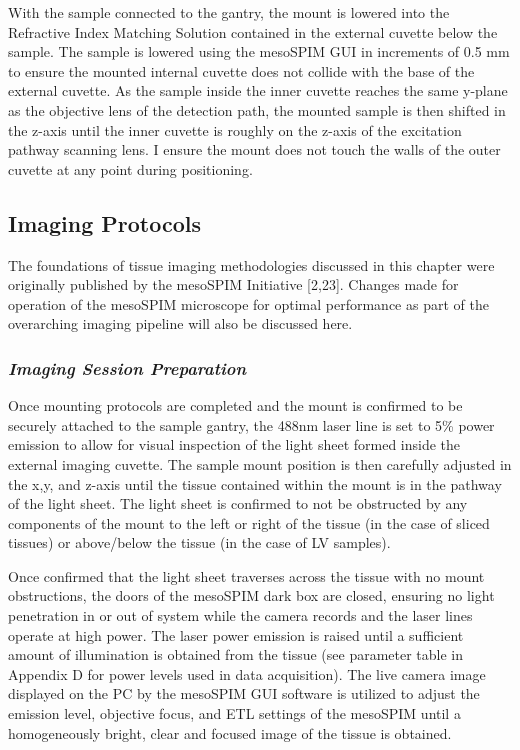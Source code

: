 With the sample connected to the gantry, the mount is lowered into the Refractive Index Matching Solution contained in the external cuvette below the sample. The sample is lowered using the mesoSPIM GUI in increments of 0.5 mm to ensure the mounted internal cuvette does not collide with the base of the external cuvette. As the sample inside the inner cuvette reaches the same y-plane as the objective lens of the detection path, the mounted sample is then shifted in the z-axis until the inner cuvette is roughly on the z-axis of the excitation pathway scanning lens. I ensure the mount does not touch the walls of the outer cuvette at any point during positioning. 

\subsection{Imaging Protocols}

The foundations of tissue imaging methodologies discussed in this chapter were originally published by the mesoSPIM Initiative [2,23]. Changes made for operation of the mesoSPIM microscope for optimal performance as part of the overarching imaging pipeline will also be discussed here.

\subsubsection{\textit{Imaging Session Preparation}}
Once mounting protocols are completed and the mount is confirmed to be securely attached to the sample gantry, the 488nm laser line is set to 5\% power emission to allow for visual inspection of the light sheet formed inside the external imaging cuvette. The sample mount position is then carefully adjusted in the x,y, and z-axis until the tissue contained within the mount is in the pathway of the light sheet. The light sheet is confirmed to not be obstructed by any components of the mount to the left or right of the tissue (in the case of sliced tissues) or above/below the tissue (in the case of LV samples).

Once confirmed that the light sheet traverses across the tissue with no mount obstructions, the doors of the mesoSPIM dark box are closed, ensuring no light penetration in or out of system while the camera records and the laser lines operate at high power. The laser power emission is raised until a sufficient amount of illumination is obtained from the tissue (see parameter table in Appendix D for power levels used in data acquisition). The live camera image displayed on the PC by the mesoSPIM GUI software is  utilized to adjust the emission level, objective focus, and ETL settings of the mesoSPIM until a homogeneously bright, clear and focused image of the tissue is obtained. 

